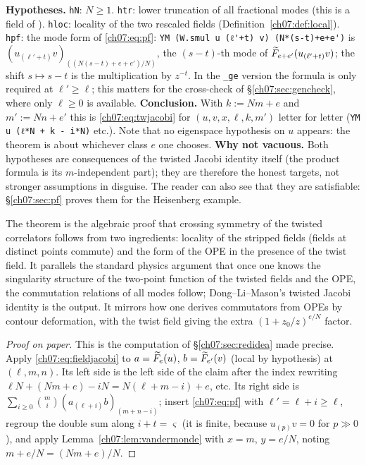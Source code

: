 \begin{dictionary}
\textbf{Hypotheses.} \verb|hN|: $N\ge1$. \verb|htr|: lower truncation of all fractional modes
(this is a field of ). \verb|hloc|: locality of the two rescaled fields
(Definition~\ref{ch07:def:local}). \verb|hpf|: the mode form of \eqref{ch07:eq:pf}:
\verb|YM (W.smul u (ℓ'+t) v) (N*(s-t)+e+e')| is $(u_{(\ell'+t)}v)_{((N(s-t)+e+e')/N)}$, the
$(s-t)$-th mode of $\widetilde{F}_{e+e'}(u_{(\ell'+t)}v)$; the shift $s\mapsto s-t$ is the
multiplication by $z^{-t}$. In the \verb|_ge| version the formula is only required at
$\ell'\ge\ell$; this matters for the cross-check of \S\ref{ch07:sec:gencheck}, where only
$\ell\ge0$ is available. \textbf{Conclusion.} With $k := Nm+e$ and $m' := Nn+e'$ this is
\eqref{ch07:eq:twjacobi} for $(u,v,x,\ell,k,m')$ letter for letter
(\verb|YM u (ℓ*N + k - i*N)| etc.). Note that no eigenspace hypothesis on $u$ appears: the
theorem is about whichever class $e$ one chooses. \textbf{Why not vacuous.} Both hypotheses are
consequences of the twisted Jacobi identity itself (the product formula is its $m$-independent
part); they are therefore the honest targets, not stronger assumptions in disguise. The reader can
also see that they are satisfiable: \S\ref{ch07:sec:pf} proves them for the Heisenberg example.
\end{dictionary}

\begin{physics}
The theorem is the algebraic proof that crossing symmetry of the twisted correlators follows from two ingredients: locality of the stripped fields (fields at distinct points commute) and the form of the OPE in the presence of the twist field. It parallels the standard physics argument that once one knows the singularity structure of the two-point function of the twisted fields and the OPE, the commutation relations of all modes follow; Dong--Li--Mason's twisted Jacobi identity is the output. It mirrors how one derives commutators from OPEs by contour deformation, with the twist field giving the extra $(1+z_0/z)^{e/N}$ factor.
\end{physics}

\begin{proof}[Proof on paper]
This is the computation of \S\ref{ch07:sec:redidea} made precise. Apply
\eqref{ch07:eq:fieldjacobi} to $a = \widetilde{F}_e(u)$, $b = \widetilde{F}_{e'}(v)$ (local by
hypothesis) at $(\ell,m,n)$. Its left side is the left side of the claim after the index
rewriting $\ell N+(Nm+e)-iN = N(\ell+m-i)+e$, etc. Its right side is
$\sum_{i\ge0}\binom mi(a_{(\ell+i)}b)_{(m+n-i)}$; insert \eqref{ch07:eq:pf} with $\ell' = \ell+i
\ge\ell$, regroup the double sum along $i+t = \varsigma$ (it is finite, because $u_{(p)}v = 0$
for $p\gg0$), and apply Lemma~\ref{ch07:lem:vandermonde} with $x = m$, $y=e/N$, noting
$m+e/N = (Nm+e)/N$.
\end{proof}

